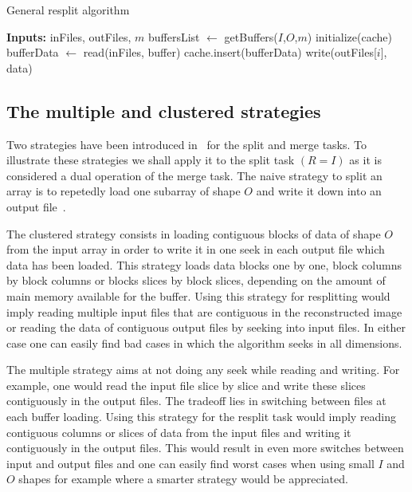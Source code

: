 \documentclass[conference]{IEEEtran}
\begin{document}
\begin{algorithm}
  \caption{General resplit algorithm}
  \label{algo:generalresplit}
  \begin{algorithmic}
    \STATE \textbf{Inputs:} inFiles, outFiles, $m$
    \STATE buffersList $\leftarrow$ getBuffers($I$,$O$,$m$)
    \STATE initialize(cache)
      \STATE bufferData $\leftarrow$ read(inFiles, buffer)
      \STATE cache.insert(bufferData)
        \STATE write(outFiles[$i$], data)
      \ENDFOR
    \ENDFOR

  \end{algorithmic}
\end{algorithm}

\subsection{The multiple and clustered strategies}
Two strategies have been introduced in~\cite{seqalgorithms} for the split and
merge tasks. To illustrate these strategies we shall apply it to the split task
$(R = I)$ as it is considered a dual operation of the merge task. The naive
strategy to split an array is to repetedly load one subarray of shape $O$ and
write it down into an output file~\cite{seqalgorithms}.

The clustered strategy consists in loading contiguous blocks of data of shape $O$
from the input array in order to write it in one seek in each output file which
data has been loaded. This strategy loads data blocks one by one, block columns
by block columns or blocks slices by block slices, depending on the amount of
main memory available for the buffer. Using this strategy for resplitting would
imply reading multiple input files that are contiguous in the reconstructed
image or reading the data of contiguous output files by seeking into input files.
In either case one can easily find bad cases in which the algorithm seeks in all
dimensions.

The multiple strategy aims at not doing any seek while reading and writing. For
example, one would read the input file slice by slice and write these slices
contiguously in the output files. The tradeoff lies in switching between files
at each buffer loading. Using this strategy for the resplit task would imply
reading contiguous columns or slices of data from the input files and writing it
contiguously in the output files. This would result in even more switches
between input and output files and one can easily find worst cases when using
small $I$ and $O$ shapes for example where a smarter strategy would be appreciated.
\end{document}
